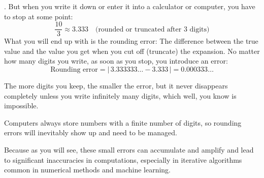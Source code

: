 
. But when you write it down or enter it into a calculator or computer, you have to stop at some point:
\begin{equation}
    \frac{10}{3} \approx 3.333 \quad \text{(rounded or truncated after 3 digits)}
\end{equation}
What you will end up with is the rounding error: The difference between the true value and the value you get when you cut off (truncate) the expansion.
No matter how many digits you write, as soon as you stop, you introduce an error:
\begin{equation}
    \text{Rounding error} = \left|\, 3.333333\ldots - 3.333\, \right| = 0.000333\ldots
\end{equation}

The more digits you keep, the smaller the error, but it never disappears completely unless you write infinitely many digits, which well, you know is impossible.

 Computers always store numbers with a finite number of digits, so rounding errors will inevitably show up and need to be managed.

Because as you will see, these small errors can accumulate and amplify and lead to significant inaccuracies in computations, especially in iterative algorithms common in numerical methods and machine learning.


